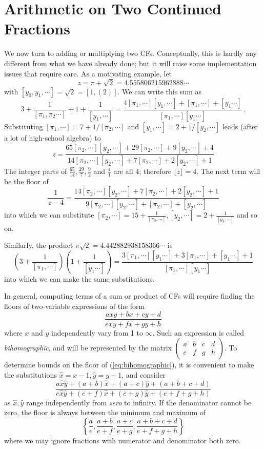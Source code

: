 \documentclass[11pt, oneside]{amsart}   	%
\newcommand{\abcd}{\left(
\begin{smallmatrix} 
a & b & c & d\\ 
e & f & g & h
\end{smallmatrix}
\right)}
\renewcommand{\:}{\negthickspace:\negthickspace}
\begin{document}
\section{Arithmetic on Two Continued Fractions}
We now turn to adding or multiplying two CFs. Conceptually, this is hardly any different from what we have already done;
but it will raise some implementation issues that require care. As a motivating example, let
\[
z = \pi + \sqrt{2} = 4.555806215962888\cdots
\]
 with $[y_0, y_1,\cdots] = \sqrt{2} = [1,(2)]$. We can write this sum as
\begin{equation*}
3 + \frac{1}{[\pi_1,\pi_2\cdots]} + 1 + \frac{1}{[y_1,\cdots]} = \frac{ 4[\pi_1,\cdots][y_1,\cdots] + [\pi_1,\cdots]  + [y_1\cdots]}{ [\pi_1,\cdots][y_1\cdots] }\ .
\end{equation*}
Substituting $[\pi_1,\cdots] = 7 + 1/[\pi_2,\cdots]$ and $[y_1,\cdots] = 2 + 1/[y_2,\cdots]$ leads (after a lot of high-school algebra) to 
\begin{equation*}
z = \frac{65[\pi_2,\cdots] [y_2,\cdots] + 29[\pi_2,\cdots] +9[y_2,\cdots] +4}{14[\pi_2,\cdots] [y_2,\cdots] + 7[\pi_2,\cdots] +2[y_2,\cdots] +1}
\end{equation*}
The integer parts of $\frac{65}{14}, \frac{29}{7}, \frac{9}{2}$ and  $\frac{4}{1}$ are all 4; therefore $\lfloor z \rfloor =4$.
The next term will be the floor of
\begin{equation*}
\frac{1}{z-4} =  \frac{14[\pi_2,\cdots] [y_2,\cdots] + 7[\pi_2,\cdots] +2[y_2,\cdots] +1}{9[\pi_2,\cdots] [y_2,\cdots] + [\pi_2,\cdots] +[y_2,\cdots]}
\end{equation*}
into which we can substitute  $[\pi_2,\cdots]=15+\frac{1}{[\pi_3,\cdots]},  [y_2,\cdots]=2+\frac{1}{[y_3,\cdots]}$ and so on.

Similarly, the product $\pi\sqrt{2}=4.442882938158366\cdots$ is
\begin{equation*}
(3 + \frac{1}{[\pi_1,\cdots]})(1 + \frac{1}{[y_1\cdots]}) 
  = \frac{ 3[\pi_1,\cdots][y_1\cdots] + 3[\pi_1,\cdots] + [y_1\cdots] +1 }{[\pi_1,\cdots][y_1\cdots] }
\end{equation*}
into which we can make the same substitutions. 

In general, computing terms of a sum or product of CFs will require finding the floors of two-variable expressions of the form
\begin{equation}\label{eq:bihomographic}
\frac{axy + bx + cy + d}{exy + fx + gy + h}
\end{equation}
where $x$ and $y$ independently vary from 1 to $\infty$. Such an expression is called \emph{bihomographic}, and will be
represented by the matrix $\abcd$. To determine bounds on the floor of (\ref{eq:bihomographic}), it is convenient to make the
substitutions $\hat{x} = x-1, \hat{y} = y-1$, and consider
\[
\frac{a\hat{x}\hat{y} + (a+b)\hat{x} + (a+c)\hat{y} + (a+b+c+d)}{e\hat{x}\hat{y} + (e+f)\hat{x} + (e+g)\hat{y} + (e+f+g+h)}
\]
as $\hat{x}, \hat{y}$ range independently from \emph{zero} to infinity. If the denominator cannot be zero, the floor is always
between the minimum and maximum of
\[
\left\{ \frac{a}{e},\frac{a+b}{e+f},\frac{a+c}{e+g},\frac{a+b+c+d}{e+f+g+h} \right\}
\]
where we may ignore fractions with numerator and denominator both zero.
\end{document}
